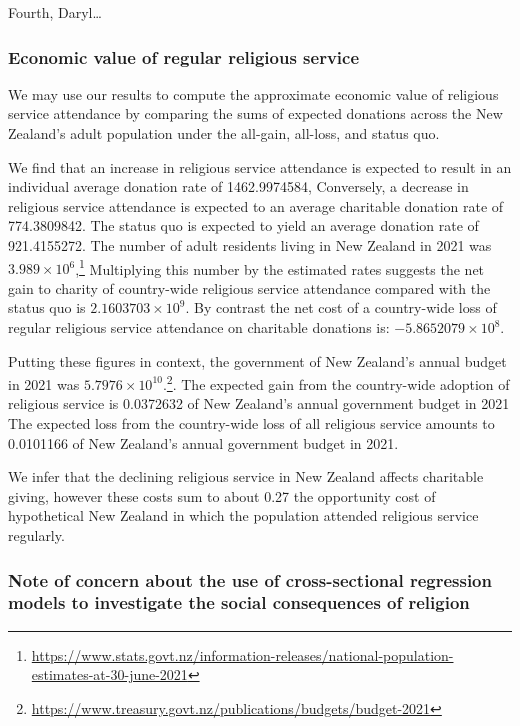 \documentclass[
  single column]{article}
\begin{document}
Fourth, Daryl\ldots{}

\subsubsection{Economic value of regular religious
service}\label{economic-value-of-regular-religious-service}

We may use our results to compute the approximate economic value of
religious service attendance by comparing the sums of expected donations
across the New Zealand's adult population under the all-gain, all-loss,
and status quo.

We find that an increase in religious service attendance is expected to
result in an individual average donation rate of 1462.9974584,
Conversely, a decrease in religious service attendance is expected to an
average charitable donation rate of 774.3809842. The status quo is
expected to yield an average donation rate of 921.4155272. The number of
adult residents living in New Zealand in 2021 was
\ensuremath{3.989\times 10^{6}},\footnote{\url{https://www.stats.govt.nz/information-releases/national-population-estimates-at-30-june-2021}}
Multiplying this number by the estimated rates suggests the net gain to
charity of country-wide religious service attendance compared with the
status quo is \ensuremath{2.1603703\times 10^{9}}. By contrast the net
cost of a country-wide loss of regular religious service attendance on
charitable donations is: \ensuremath{-5.8652079\times 10^{8}}.

Putting these figures in context, the government of New Zealand's annual
budget in 2021 was \ensuremath{5.7976\times 10^{10}}.\footnote{\url{https://www.treasury.govt.nz/publications/budgets/budget-2021}}.
The expected gain from the country-wide adoption of religious service is
0.0372632 of New Zealand's annual government budget in 2021 The expected
loss from the country-wide loss of all religious service amounts to
0.0101166 of New Zealand's annual government budget in 2021.

We infer that the declining religious service in New Zealand affects
charitable giving, however these costs sum to about 0.27 the opportunity
cost of hypothetical New Zealand in which the population attended
religious service regularly.

\subsubsection{Note of concern about the use of cross-sectional
regression models to investigate the social consequences of
religion}\label{note-of-concern-about-the-use-of-cross-sectional-regression-models-to-investigate-the-social-consequences-of-religion}
\end{document}
